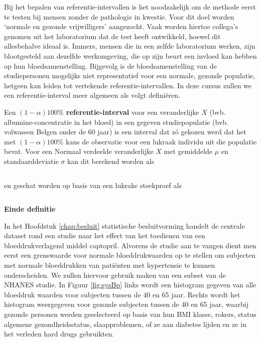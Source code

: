 \documentclass[12pt,dutch,coursenotes]{book}
\theoremstyle{definition}
\theoremstyle{definition}
\theoremstyle{definition}
\theoremstyle{remark}
\let\BeginKnitrBlock\begin \let\EndKnitrBlock\end
\begin{document}
Bij het bepalen van referentie-intervallen is het noodzakelijk om de
methode eerst te testen bij mensen zonder de pathologie in kwestie. Voor
dit doel worden `normale en gezonde vrijwilligers' aangezocht. Vaak
worden hiertoe collega's genomen uit het laboratorium dat de test heeft
ontwikkeld, hoewel dit allesbehalve ideaal is. Immers, mensen die in een
zelfde laboratorium werken, zijn blootgesteld aan dezelfde werkomgeving,
die op zijn beurt een invloed kan hebben op hun bloedsamenstelling.
Bijgevolg is de bloedsamenstelling van de studiepersonen mogelijks niet
representatief voor een normale, gezonde populatie, hetgeen kan leiden
tot vertekende referentie-intervallen. In deze cursus zullen we een
referentie-interval meer algemeen als volgt definiëren.

\BeginKnitrBlock{definition}[referentie-interval]
\protect\hypertarget{def:unnamed-chunk-51}{}{\label{def:unnamed-chunk-51}
\iffalse (referentie-interval) \fi{} }Een \textbf{\((1-\alpha)100\%\)
referentie-interval} voor een veranderlijke \(X\) (bvb.
albumine-concentratie in het bloed) in een gegeven studiepopulatie (bvb.
volwassen Belgen onder de 60 jaar) is een interval dat zó gekozen werd
dat het met \((1-\alpha)100\%\) kans de observatie voor een lukraak
individu uit die populatie bevat. Voor een Normaal verdeelde
veranderlijke \(X\) met gemiddelde \(\mu\) en standaarddeviatie
\(\sigma\) kan dit berekend worden als

\begin{equation*}
[\mu-z_{\alpha/2}\sigma,\mu+z_{\alpha/2}\sigma]
\end{equation*}

en geschat worden op basis van een lukrake steekproef als

\begin{equation*}
[\bar x-z_{\alpha/2}s_x,\bar x+z_{\alpha/2}s_x]
\end{equation*}

\textbf{Einde definitie}
\EndKnitrBlock{definition}

\BeginKnitrBlock{example}[Referentie-intervallen]
\protect\hypertarget{exm:unnamed-chunk-52}{}{\label{exm:unnamed-chunk-52}
\iffalse (Referentie-intervallen) \fi{} }
\EndKnitrBlock{example} In het Hoofdstuk \ref{chap:besluit} statistische
besluitvorming handelt de centrale dataset rond een studie naar het
effect van het toedienen van een bloeddrukverlagend middel captopril.
Alvorens de studie aan te vangen dient men eerst een grenswaarde voor
normale bloeddrukwaarden op te stellen om subjecten met normale
bloeddrukken van patiënten met hypertensie te kunnen onderscheiden. We
zullen hiervoor gebruik maken van een subset van de NHANES studie. In
Figuur \ref{fig:sysBp} links wordt een histogram gegeven van alle
bloeddruk waarden voor subjecten tussen de 40 en 65 jaar. Rechts wordt
het histogram weergegeven voor gezonde subjecten tussen de 40 en 65
jaar, waarbij gezonde personen werden geselecteerd op basis van hun BMI
klasse, rokers, status algemene gezondheidsstatus, slaapproblemen, of ze
aan diabetes lijden en ze in het verleden hard drugs gebruikten.
\end{document}
